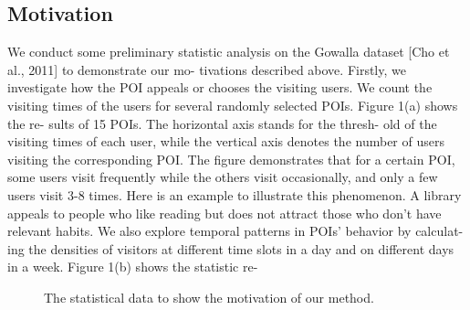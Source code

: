 \documentclass{article}
\begin{document}
\subsection{Motivation}
We conduct some preliminary statistic analysis on the
Gowalla dataset [Cho et al., 2011] to demonstrate our mo-
tivations described above.
Firstly, we investigate how the POI appeals or chooses the
visiting users. We count the visiting times of the users for
several randomly selected POIs. Figure 1(a) shows the re-
sults of 15 POIs. The horizontal axis stands for the thresh-
old of the visiting times of each user, while the vertical axis
denotes the number of users visiting the corresponding POI.
The figure demonstrates that for a certain POI, some users
visit frequently while the others visit occasionally, and only a
few users visit 3-8 times. Here is an example to illustrate this
phenomenon. A library appeals to people who like reading
but does not attract those who don’t have relevant habits. We
also explore temporal patterns in POIs’ behavior by calculat-
ing the densities of visitors at different time slots in a day and
on different days in a week. Figure 1(b) shows the statistic re-

\begin{figure*}[h]
    \centering
    \hspace{0.1cm}\hspace{0.1cm}
    \hspace{0.1cm}\hspace{0.1cm}
    \caption{The statistical data to show the motivation of our method.}
    \label{fig:fig1}
\end{figure*}
\end{document}
